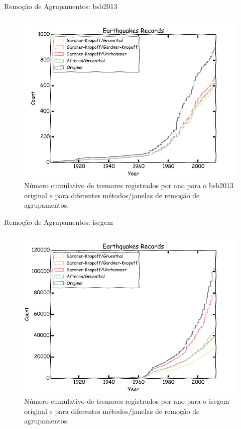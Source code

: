 \documentclass[ucs,8pt]{beamer}
\begin{document}
\begin{frame}{Remoção de Agrupamentos: \gls{bsb2013}}
\begin{figure}[H]
	\centering
	\includegraphics[height=0.90\textheight]{decluster_br}
	\caption{Número cumulativo de tremores registrados por ano para o \gls{bsb2013}
	original e para diferentes métodos/janelas de remoção de agrupamentos.}
	\label{fig:br_eq_record}
\end{figure}
\end{frame}


\begin{frame}{Remoção de Agrupamentos: \gls{iscgem}}
\begin{figure}[H]
	\centering
	\includegraphics[height=0.90\textheight]{decluster_sa}
	\caption{Número cumulativo de tremores registrados por ano para o \gls{iscgem}
	original e para diferentes métodos/janelas de remoção de agrupamentos.}
	\label{fig:sa_eq_record}
	\end{figure}%
\end{frame}
\end{document}
